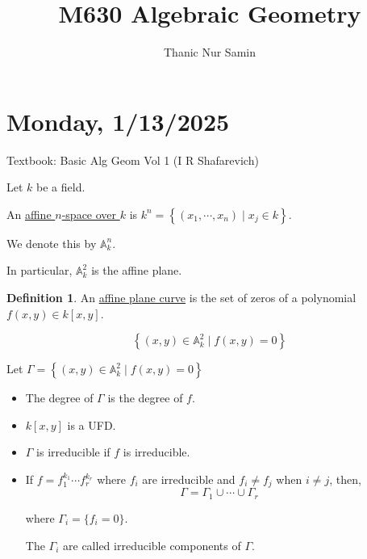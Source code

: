 \documentclass{article}
\title{M630 Algebraic Geometry}
\author{Thanic Nur Samin}
\date{\vspace{-5ex}}
\theoremstyle{definition}
\newtheorem*{definition}{Definition}
\begin{document}
    \maketitle

    \section*{Monday, 1/13/2025}
    
    Textbook: Basic Alg Geom Vol 1 (I R Shafarevich)

    Let \(k\) be a field.

    An \underline{affine \(n\)-space over \(k\)} is \(k^n = \left\{ (x_1, \cdots , x_n) \mid x_j \in k \right\}\).

    We denote this by \(\mathbb{A}_k^n\).

    In particular, \(\mathbb{A}_k^2\) is the affine plane.

    \begin{definition}
        An \underline{affine plane curve} is the set of zeros of a polynomial \(f(x,y) \in k[x,y]\).
        
        \[
            \left\{ (x,y) \in \mathbb{A}_k^2 \mid f(x,y) = 0 \right\} 
        \]
    \end{definition}

    Let \(\Gamma = \left\{ (x,y) \in \mathbb{A}_k^2 \mid f(x,y)=0 \right\} \) 

    \begin{itemize}
        \item The degree of \(\Gamma\) is the degree of \(f\).
        \item \(k[x,y]\) is a UFD.
        \item \(\Gamma\) is irreducible if \(f\) is irreducible.
        \item If \(f = f_1^{k_1} \cdots f_r^{k_r}\) where \(f_i\) are irreducible and \(f_i \neq f_j\) when \(i\neq j\), then,
        \[
            \Gamma = \Gamma_1 \cup \cdots \cup \Gamma_r
        \]

        where \(\Gamma_i = \{ f_i = 0 \}\).

        The \(\Gamma_i\) are called irreducible components of \(\Gamma\).
    \end{itemize} 
\end{document}
